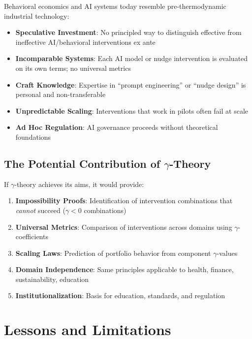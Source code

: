 Behavioral economics and AI systems today resemble pre-thermodynamic
industrial technology:

\begin{itemize}
    \item \textbf{Speculative Investment}: No principled way to distinguish
    effective from ineffective AI/behavioral interventions ex ante
    \item \textbf{Incomparable Systems}: Each AI model or nudge intervention
    is evaluated on its own terms; no universal metrics
    \item \textbf{Craft Knowledge}: Expertise in ``prompt engineering'' or
    ``nudge design'' is personal and non-transferable
    \item \textbf{Unpredictable Scaling}: Interventions that work in pilots
    often fail at scale
    \item \textbf{Ad Hoc Regulation}: AI governance proceeds without
    theoretical foundations
\end{itemize}

\subsection{The Potential Contribution of $\gamma$-Theory}

If $\gamma$-theory achieves its aims, it would provide:

\begin{enumerate}
    \item \textbf{Impossibility Proofs}: Identification of intervention
    combinations that \textit{cannot} succeed ($\gamma < 0$ combinations)
    \item \textbf{Universal Metrics}: Comparison of interventions across
    domains using $\gamma$-coefficients
    \item \textbf{Scaling Laws}: Prediction of portfolio behavior from
    component $\gamma$-values
    \item \textbf{Domain Independence}: Same principles applicable to health,
    finance, sustainability, education
    \item \textbf{Institutionalization}: Basis for education, standards,
    and regulation
\end{enumerate}


\section{Lessons and Limitations}
\label{sec:thermo-lessons}


